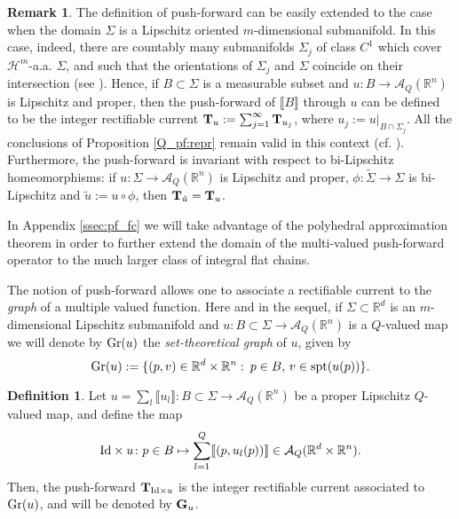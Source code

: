 \documentclass[a4paper,11pt,reqno]{amsart}
\theoremstyle{definition}
\newtheorem{definition}[theorem]{Definition}
\newtheorem{remark}[theorem]{Remark}
\numberwithin{equation}{section}
\numberwithin{subsection}{section}
\newcommand{\R}{\mathbb{R}}
\newcommand{\A}{\mathcal{A}}
\newcommand{\spt}{\mathrm{spt}}
\newcommand{\Ha}{\mathcal{H}}
\begin{document}
\begin{remark} \label{ext:lip_man}
The definition of push-forward can be easily extended to the case when the domain $\Sigma$ is a Lipschitz oriented $m$-dimensional submanifold. In this case, indeed, there are countably many submanifolds $\Sigma_{j}$ of class $C^{1}$ which cover $\Ha^{m}$-a.a. $\Sigma$, and such that the orientations of $\Sigma_{j}$ and $\Sigma$ coincide on their intersection (see \cite[Theorem 5.3]{Sim83}). Hence, if $B \subset \Sigma$ is a measurable subset and $u \colon B \to \A_{Q}(\R^{n})$ is Lipschitz and proper, then the push-forward of $\llbracket B \rrbracket$ through $u$ can be defined to be the integer rectifiable current ${\bf T}_{u} := \sum_{j=1}^{\infty} {\bf T}_{u_{j}}$, where $u_{j} := u|_{B \cap \Sigma_{j}}$. All the conclusions of Proposition \ref{Q_pf:repr} remain valid in this context (cf. \cite[Lemma 1.7]{DLS13a}). Furthermore, the push-forward is invariant with respect to bi-Lipschitz homeomorphisms: if $u \colon \Sigma \to \A_{Q}(\R^{n})$ is Lipschitz and proper, $\phi \colon \tilde{\Sigma} \to \Sigma$ is bi-Lipschitz and $\tilde{u} := u \circ \phi$, then ${\bf T}_{\tilde{u}} = {\bf T}_{u}$. 

In Appendix \ref{ssec:pf_fc} we will take advantage of the polyhedral approximation theorem in order to further extend the domain of the multi-valued push-forward operator to the much larger class of integral flat chains.
\end{remark}

The notion of push-forward allows one to associate a rectifiable current to the \emph{graph} of a multiple valued function. Here and in the sequel, if $\Sigma \subset \R^{d}$ is an $m$-dimensional Lipschitz submanifold and $u \colon B \subset \Sigma \to \A_{Q}(\R^{n})$ is a $Q$-valued map we will denote by ${\rm Gr}(u)$ the \emph{set-theoretical graph} of $u$, given by
\[
{\rm Gr}(u) := \lbrace \left( p,v \right) \in \R^{d} \times \R^{n} \, \colon \, p \in B, \, v \in \spt(u(p)) \rbrace.
\]
\begin{definition}\label{def_graph}
Let $u = \sum_{l} \llbracket u_{l} \rrbracket \colon B \subset \Sigma \to \A_{Q}(\R^{n})$ be a proper Lipschitz $Q$-valued map, and define the map 
\[
{\rm Id} \times u \colon p \in B \mapsto \sum_{l=1}^{Q} \llbracket \left( p, u_{l}(p) \right) \rrbracket \in \A_{Q}(\R^{d} \times \R^{n}).
\]
Then, the push-forward ${\bf T}_{{\rm Id} \times u}$ is the integer rectifiable current associated to ${\rm Gr}(u)$, and will be denoted by ${\bf G}_{u}$.
\end{definition}
\end{document}
